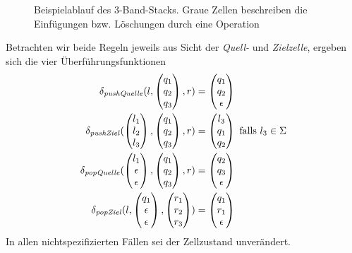 \documentclass{article}
\begin{document}
\begin{figure}[h]
    \caption{Beispielablauf des 3-Band-Stacks. Graue Zellen beschreiben die Einfügungen bzw. Löschungen durch eine Operation}
\end{figure}
Betrachten wir beide Regeln jeweils aus Sicht der \emph{Quell-} und \emph{Zielzelle}, ergeben sich die vier Überführungsfunktionen
\begin{align*}
    \delta_{\mathit{pushQuelle}}(l,\begin{pmatrix}q_1\\q_2\\q_3\end{pmatrix},r) &= \begin{pmatrix}q_1\\q_2\\\epsilon\end{pmatrix} \\
    \delta_{\mathit{pushZiel}}(\begin{pmatrix}l_1\\l_2\\l_3\end{pmatrix},\begin{pmatrix}q_1\\q_2\\q_3\end{pmatrix},r) &= \begin{pmatrix}l_3\\q_1\\q_2\end{pmatrix} \text{ falls } l_3 \in \Sigma \\
    \delta_{\mathit{popQuelle}}(\begin{pmatrix}l_1\\\epsilon\\\epsilon\end{pmatrix},\begin{pmatrix}q_1\\q_2\\q_3\end{pmatrix},r) &= \begin{pmatrix}q_2\\q_3\\\epsilon\end{pmatrix} \\
    \delta_{\mathit{popZiel}}(l,\begin{pmatrix}q_1\\\epsilon\\\epsilon\end{pmatrix},\begin{pmatrix}r_1\\r_2\\r_3\end{pmatrix}) &= \begin{pmatrix}q_1\\r_1\\\epsilon\end{pmatrix}
\end{align*}
In allen nichtspezifizierten Fällen sei der Zellzustand unverändert.
\end{document}
